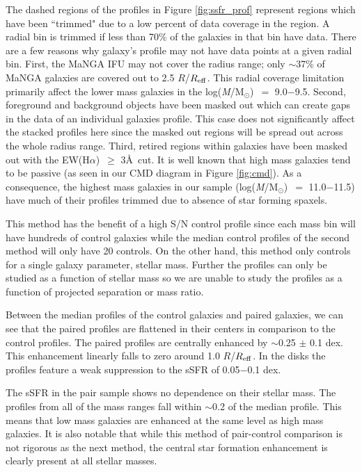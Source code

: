 \documentclass[iop,revtex4,twocolumn,apj,numberedappendix,appendixfloats]{emulateapj}
\newcommand{\reff}{$R_{\rm eff}$}
\newcommand{\ewha}{EW(H$\alpha$)}
\newcommand{\logm}{log({\it M}/M$_{\odot}$)}
\begin{document}
The dashed regions of the profiles in Figure \ref{fig:ssfr_prof} represent regions which have been ``trimmed" due to a low percent of data coverage in the region. A radial bin is trimmed if less than 70\% of the galaxies in that bin have data. There are a few reasons why galaxy's profile may not have data points at a given radial bin. First, the MaNGA IFU may not cover the radius range; only $\sim$37\% of MaNGA galaxies are covered out to 2.5 $R$/\reff. This radial coverage limitation primarily affect the lower mass galaxies in the \logm\ $=$ 9.0$-$9.5. Second, foreground and background objects have been masked out which can create gaps in the data of an individual galaxies profile. This case does not significantly affect the stacked profiles here since the masked out regions will be spread out across the whole radius range. Third, retired regions within galaxies have been masked out with the \ewha\ $\ge$ 3\AA\ cut. It is well known that high mass galaxies tend to be passive (as seen in our CMD diagram in Figure \ref{fig:cmd}). As a consequence, the highest mass galaxies in our sample (\logm\ $=$ 11.0$-$11.5) have much of their profiles trimmed due to absence of star forming spaxels. 

This method has the benefit of a high S/N control profile since each mass bin will have hundreds of control galaxies while the median control profiles of the second method will only have 20 controls. On the other hand, this method only controls for a single galaxy parameter, stellar mass. Further the profiles can only be studied as a function of stellar mass so we are unable to study the profiles as a function of projected separation or mass ratio. 

Between the median profiles of the control galaxies and paired galaxies, we can see that the paired profiles are flattened in their centers in comparison to the control profiles. The paired profiles are centrally enhanced by $\sim$0.25 $\pm$ 0.1 dex. This enhancement linearly falls to zero around 1.0 $R$/\reff. In the disks the profiles feature a weak suppression to the sSFR of 0.05$-$0.1 dex. 

The sSFR in the pair sample shows no dependence on their stellar mass. The profiles from all of the mass ranges fall within $\sim$0.2 of the median profile. This means that low mass galaxies are enhanced at the same level as high mass galaxies. It is also notable that while this method of pair-control comparison is not rigorous as the next method, the central star formation enhancement is clearly present at all stellar masses.
\end{document}
